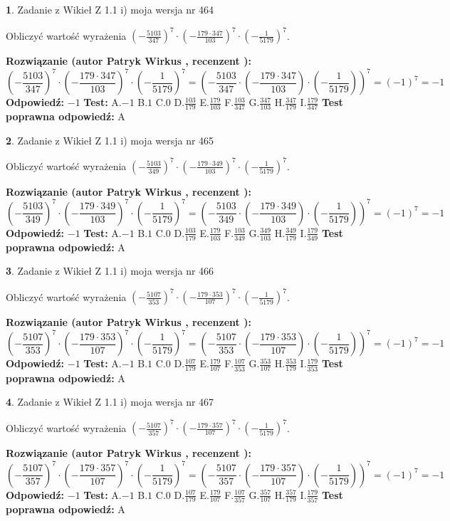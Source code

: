 \documentclass[12pt, a4paper]{article}
\theoremstyle{definition} %
\newtheorem{zad}{}
\newcommand{\zadStart}[1]{\begin{zad}#1\newline}
\newcommand{\zadStop}{\end{zad}}
\newcommand{\rozwStart}[2]{\noindent \textbf{Rozwiązanie (autor #1 , recenzent #2): }\newline}
\newcommand{\rozwStop}{\newline}
\newcommand{\odpStart}{\noindent \textbf{Odpowiedź:}\newline}
\newcommand{\odpStop}{\newline}
\newcommand{\testStart}{\noindent \textbf{Test:}\newline}
\newcommand{\testStop}{\newline}
\newcommand{\kluczStart}{\noindent \textbf{Test poprawna odpowiedź:}\newline}
\newcommand{\kluczStop}{\newline}
\begin{document}
\zadStart{Zadanie z Wikieł Z 1.1 i) moja wersja nr 464}

Obliczyć wartość wyrażenia $(-\frac{5103}{347})^{7} \cdot (-\frac{179 \cdot 347}{103})^{7} \cdot (-\frac{1}{5179})^{7}$.
\zadStop
\rozwStart{Patryk Wirkus}{}
$$(-\frac{5103}{347})^{7} \cdot (-\frac{179 \cdot 347}{103})^{7} \cdot (-\frac{1}{5179})^{7} = (-\frac{5103}{347} \cdot (-\frac{179 \cdot 347}{103}) \cdot (-\frac{1}{5179}))^{7} = (-1)^{7} = -1$$
\rozwStop
\odpStart
$-1$
\odpStop
\testStart
A.$-1$ B.$1$ C.$0$ D.$\frac{103}{179}$ E.$\frac{179}{103}$
F.$\frac{103}{347}$ G.$\frac{347}{103}$
H.$\frac{347}{179}$
I.$\frac{179}{347}$
\testStop
\kluczStart
A
\kluczStop



\zadStart{Zadanie z Wikieł Z 1.1 i) moja wersja nr 465}

Obliczyć wartość wyrażenia $(-\frac{5103}{349})^{7} \cdot (-\frac{179 \cdot 349}{103})^{7} \cdot (-\frac{1}{5179})^{7}$.
\zadStop
\rozwStart{Patryk Wirkus}{}
$$(-\frac{5103}{349})^{7} \cdot (-\frac{179 \cdot 349}{103})^{7} \cdot (-\frac{1}{5179})^{7} = (-\frac{5103}{349} \cdot (-\frac{179 \cdot 349}{103}) \cdot (-\frac{1}{5179}))^{7} = (-1)^{7} = -1$$
\rozwStop
\odpStart
$-1$
\odpStop
\testStart
A.$-1$ B.$1$ C.$0$ D.$\frac{103}{179}$ E.$\frac{179}{103}$
F.$\frac{103}{349}$ G.$\frac{349}{103}$
H.$\frac{349}{179}$
I.$\frac{179}{349}$
\testStop
\kluczStart
A
\kluczStop



\zadStart{Zadanie z Wikieł Z 1.1 i) moja wersja nr 466}

Obliczyć wartość wyrażenia $(-\frac{5107}{353})^{7} \cdot (-\frac{179 \cdot 353}{107})^{7} \cdot (-\frac{1}{5179})^{7}$.
\zadStop
\rozwStart{Patryk Wirkus}{}
$$(-\frac{5107}{353})^{7} \cdot (-\frac{179 \cdot 353}{107})^{7} \cdot (-\frac{1}{5179})^{7} = (-\frac{5107}{353} \cdot (-\frac{179 \cdot 353}{107}) \cdot (-\frac{1}{5179}))^{7} = (-1)^{7} = -1$$
\rozwStop
\odpStart
$-1$
\odpStop
\testStart
A.$-1$ B.$1$ C.$0$ D.$\frac{107}{179}$ E.$\frac{179}{107}$
F.$\frac{107}{353}$ G.$\frac{353}{107}$
H.$\frac{353}{179}$
I.$\frac{179}{353}$
\testStop
\kluczStart
A
\kluczStop



\zadStart{Zadanie z Wikieł Z 1.1 i) moja wersja nr 467}

Obliczyć wartość wyrażenia $(-\frac{5107}{357})^{7} \cdot (-\frac{179 \cdot 357}{107})^{7} \cdot (-\frac{1}{5179})^{7}$.
\zadStop
\rozwStart{Patryk Wirkus}{}
$$(-\frac{5107}{357})^{7} \cdot (-\frac{179 \cdot 357}{107})^{7} \cdot (-\frac{1}{5179})^{7} = (-\frac{5107}{357} \cdot (-\frac{179 \cdot 357}{107}) \cdot (-\frac{1}{5179}))^{7} = (-1)^{7} = -1$$
\rozwStop
\odpStart
$-1$
\odpStop
\testStart
A.$-1$ B.$1$ C.$0$ D.$\frac{107}{179}$ E.$\frac{179}{107}$
F.$\frac{107}{357}$ G.$\frac{357}{107}$
H.$\frac{357}{179}$
I.$\frac{179}{357}$
\testStop
\kluczStart
A
\kluczStop
\end{document}
